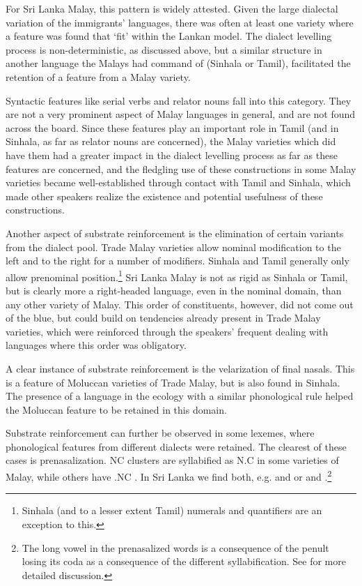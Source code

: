 For Sri Lanka Malay, this pattern is widely attested. Given the large dialectal variation of the immigrants' languages, there was often at least one variety where a feature was found that `fit' within the Lankan model. The dialect levelling process is non-deterministic, as discussed above, but a similar structure in another language the Malays had command of (Sinhala or Tamil), facilitated the retention of a feature from a Malay variety. 

Syntactic features like serial verbs and relator nouns fall into this category. They are not a very prominent aspect of Malay languages in general, and are not found across the board. Since these features play an important role in Tamil (and in Sinhala, as far as relator nouns are concerned), the Malay varieties which did have them had a greater impact in the dialect levelling process as far as these features are concerned, and the fledgling use of these constructions in some Malay varieties became well-established through contact with Tamil and Sinhala, which made other speakers realize the existence and potential usefulness of these constructions.

Another aspect of substrate reinforcement is the elimination of certain variants from the dialect pool. Trade Malay varieties allow nominal modification to the left and to the right for a number of modifiers. Sinhala and Tamil generally only allow prenominal position.\footnote{Sinhala 
 (and to a lesser extent Tamil) numerals and quantifiers are an exception to this.
} 
Sri Lanka Malay is not as rigid as Sinhala or Tamil, but is clearly more a right-headed language, even in the nominal domain, than any other variety of Malay. This order of constituents, however, did not come out of the blue, but could build on tendencies already present in Trade Malay varieties, which were reinforced through the speakers' frequent dealing with languages where this order was obligatory.

A clear instance of substrate reinforcement is the velarization of final nasals. This is a feature of Moluccan varieties of Trade Malay, but is also found in Sinhala. The presence of a language in the ecology with a similar phonological rule helped the Moluccan feature to be retained in this domain.

Substrate reinforcement can further be observed in some lexemes, where phonological features from different dialects were retained. The clearest of these cases is prenasalization. NC clusters are syllabified as N.C in some varieties of Malay, while others have .NC \citep{Tapovanaye1995,ApoussidouEtAl2008,Nordhoff2009}. In Sri Lanka we find both, e.g.  and  or  and .\footnote{The 
 long vowel in the prenasalized words is a consequence of the penult losing its coda as a consequence of the different syllabification. See \citet[120ff]{Nordhoff2009} for more detailed discussion.
}

